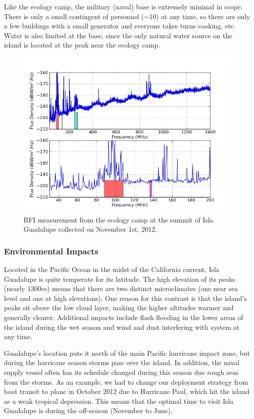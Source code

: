 Like the ecology camp, the military (naval) base is extremely minimal in scope. There is only a small contingent of personnel ($\sim$10) at any time, so there are only a few buildings with a small generator and everyone takes turns cooking, etc. Water is also limited at the base, since the only natural water source on the island is located at the peak near the ecology camp. 

\begin{figure}[tb]
\begin{center}
\includegraphics[width=0.9\linewidth]{RFI_testing/figures/GI_3__bands.png}
\caption{RFI measurement from the ecology camp at the summit of Isla Guadalupe collected on November 1st, 2012.}
\label{Fig:guadsummit}
\end{center}
\end{figure}

\subsubsection{Environmental Impacts}

Located in the Pacific Ocean in the midst of the California current, Isla Guadalupe is quite temperate for its latitude. The high elevation of its peaks (nearly $1300 m$) means that there are two distinct microclimates (one near sea level and one at high elevations). One reason for this contrast is that the island's peaks sit above the low cloud layer, making the higher altitudes warmer and generally clearer. Additional impacts include flash flooding in the lower areas of the island during the wet season and wind and dust interfering with system at any time. 

Guadalupe's location puts it north of the main Pacific hurricane impact zone, but during the hurricane season storms pass over the island. In addition, the naval supply vessel often has its schedule changed during this season due rough seas from the storms. As an example, we had to change our deployment strategy from boat transit to plane in October 2012 due to Hurricane Paul, which hit the island as a weak tropical depression. This means that the optimal time to visit Isla Guadalupe is during the off-season (November to June). 


